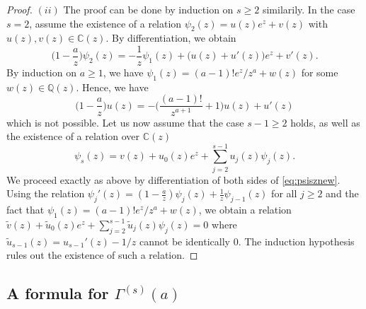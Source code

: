 \documentclass[reqno,12pt]{article}
\numberwithin{equation}{section}
\theoremstyle{remark}
\begin{document}
\begin{proof}
\medskip

$(ii)$ The proof can be done by induction on $s\ge 2$ similarily. In the case $s=2$, assume the existence of a relation $\psi_2(z)=u(z)e^z+v(z)$ with $u(z), v(z)\in \mathbb C(z)$. By differentiation, we obtain
$$
\Big(1-\frac{a}{z}\Big)\psi_2(z)=-\frac{1}{z}\psi_1(z)+\big(u(z)+u'(z)\big)e^z+v'(z).
$$
By induction on $a\ge 1$, we have $\psi_1(z)=(a-1)!e^z/z^{a}+w(z)$ for some $w(z)\in \mathbb Q(z)$. Hence, we have 
$$
\Big(1-\frac{a}{z}\Big)u(z)=-\Big(\frac{(a-1)!}{z^{a+1}}+1\Big)u(z)+u'(z)
$$
which is not possible. Let us now assume that the case $s-1\ge 2$ holds, as well as the existence of a relation over $\mathbb C(z)$
\begin{equation} \label{eq:psisznew}
    \psi_s(z)=v(z)+u_0(z)e^z+\sum_{j=2}^{s-1} u_j(z)\psi_j(z).
\end{equation}
We proceed exactly as above by differentiation of both sides of \eqref{eq:psisznew}. Using the relation  $\psi_j'(z)=(1-\frac{a}{z})\psi_j(z)+\frac{1}{z}\psi_{j-1}(z)$
for all $j\ge 2$ and the fact that $\psi_1(z)=(a-1)!e^z/z^{a}+w(z)$, we obtain a relation 
$
\widetilde{v}(z)+\widetilde{u}_0(z)e^z+\sum_{j=2}^{s-1} \widetilde{u}_j(z)\psi_j(z) =0 
$
where $\widetilde{u}_{s-1}(z)=u_{s-1}'(z)-1/z$ 
cannot be identically 0. The induction hypothesis rules out the existence of such a relation.
\end{proof}

\subsection{A formula for $ \Gamma^{(s)}(a)$}\label{ssec:proofprop3}
\end{document}
